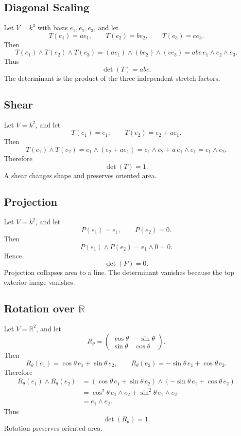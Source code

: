 \documentclass[11pt]{memoir}
\providecommand{\bR}{\mathbb{R}}
\begin{document}
\subsection{Diagonal Scaling}

Let \(V=k^3\) with basis \(e_1,e_2,e_3\), and let
\[
  T(e_1)=a e_1,\qquad T(e_2)=b e_2,\qquad T(e_3)=c e_3.
\]
Then
\[
  T(e_1)\wedge T(e_2)\wedge T(e_3)
  =
  (a e_1)\wedge(b e_2)\wedge(c e_3)
  =
  abc\,e_1\wedge e_2\wedge e_3.
\]
Thus
\[
  \det(T)=abc.
\]
The determinant is the product of the three independent stretch
factors.

\subsection{Shear}

Let \(V=k^2\), and let
\[
  T(e_1)=e_1,\qquad T(e_2)=e_2+a e_1.
\]
Then
\[
  T(e_1)\wedge T(e_2)
  =
  e_1\wedge(e_2+a e_1)
  =
  e_1\wedge e_2+a\,e_1\wedge e_1
  =
  e_1\wedge e_2.
\]
Therefore
\[
  \det(T)=1.
\]
A shear changes shape and preserves oriented area.

\subsection{Projection}

Let \(V=k^2\), and let
\[
  P(e_1)=e_1,\qquad P(e_2)=0.
\]
Then
\[
  P(e_1)\wedge P(e_2)=e_1\wedge0=0.
\]
Hence
\[
  \det(P)=0.
\]
Projection collapses area to a line. The determinant vanishes because
the top exterior image vanishes.

\subsection{\texorpdfstring{Rotation over \(\bR\)}{Rotation over R}}

Let \(V=\bR^2\), and let
\[
  R_\theta=
  \begin{pmatrix}
    \cos\theta & -\sin\theta\\
    \sin\theta & \cos\theta
  \end{pmatrix}.
\]
Then
\[
  R_\theta(e_1)=\cos\theta\,e_1+\sin\theta\,e_2,
  \qquad
  R_\theta(e_2)=-\sin\theta\,e_1+\cos\theta\,e_2.
\]
Therefore
\begin{align*}
  R_\theta(e_1)\wedge R_\theta(e_2)
  &=
  (\cos\theta\,e_1+\sin\theta\,e_2)
  \wedge
  (-\sin\theta\,e_1+\cos\theta\,e_2)\\
  &=
  \cos^2\theta\,e_1\wedge e_2
  +
  \sin^2\theta\,e_1\wedge e_2\\
  &=
  e_1\wedge e_2.
\end{align*}
Thus
\[
  \det(R_\theta)=1.
\]
Rotation preserves oriented area.
\end{document}
